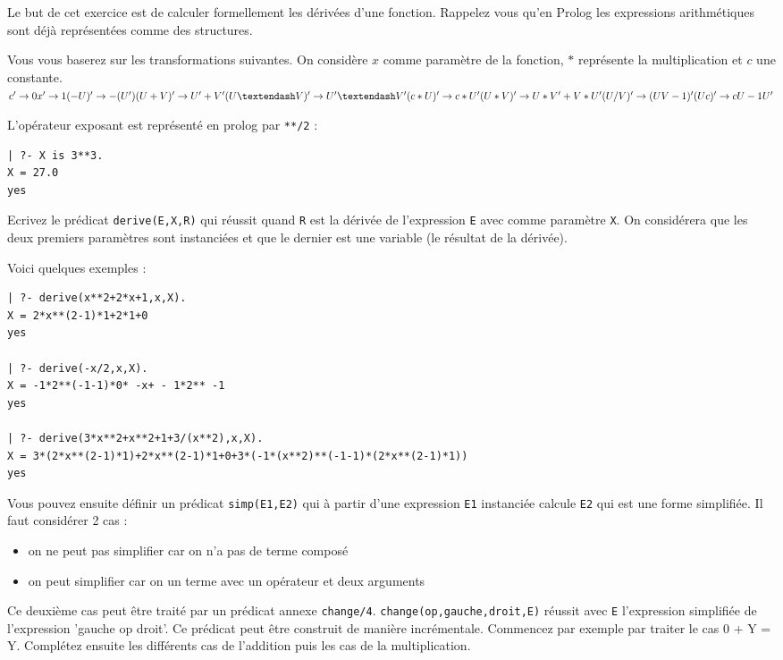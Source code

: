 \documentclass[a4paper]{article}
\begin{document}
\begin{Exercise}[title={les dérivées}]
Le but de cet exercice est de calculer formellement les dérivées d'une 
fonction. Rappelez vous qu'en Prolog les expressions arithmétiques sont
déjà représentées comme des structures.

Vous vous baserez sur les transformations suivantes. On considère $x$ comme
paramètre de la fonction, $*$ représente la multiplication et $c$ une
constante.\\
\begin{math}
c' \rightarrow 0\\
x' \rightarrow 1\\
(-U)' \rightarrow -(U')\\
(U + V)' \rightarrow U' + V'\\
(U – V)' \rightarrow U' – V'\\
(c * U)' \rightarrow c * U'\\
(U * V)' \rightarrow U * V' + V * U'\\
(U /  V)' \rightarrow (UV-1)'\\
(Uc)' \rightarrow c U-1 U'
\end{math}

L'opérateur exposant est représenté en prolog par \verb#**/2# :
\begin{verbatim}
| ?- X is 3**3.                 
X = 27.0 
yes 
\end{verbatim}

Ecrivez le prédicat \verb#derive(E,X,R)# qui réussit quand \verb#R# est la
dérivée de l'expression \verb#E# avec comme paramètre \verb#X#. On considérera
que les deux premiers paramètres sont instanciées et que le dernier est une
variable (le résultat de la dérivée).
 
Voici quelques exemples :
\begin{verbatim}
| ?- derive(x**2+2*x+1,x,X).    
X = 2*x**(2-1)*1+2*1+0 
yes 

| ?- derive(-x/2,x,X). 
X = -1*2**(-1-1)*0* -x+ - 1*2** -1 
yes 

| ?- derive(3*x**2+x**2+1+3/(x**2),x,X).    
X = 3*(2*x**(2-1)*1)+2*x**(2-1)*1+0+3*(-1*(x**2)**(-1-1)*(2*x**(2-1)*1)) 
yes 
\end{verbatim}
Vous pouvez ensuite définir un prédicat \verb#simp(E1,E2)# qui à partir d'une
expression \verb#E1# instanciée calcule \verb#E2# qui est une forme simplifiée.
Il faut considérer 2 cas :
\begin{itemize}
 \item on ne peut pas simplifier car on n'a pas de terme composé
 \item on peut simplifier car on un terme avec un opérateur et deux arguments
\end{itemize}
Ce deuxième cas peut être traité par un prédicat annexe \verb#change/4#.
\verb#change(op,gauche,droit,E)# réussit avec \verb#E# l'expression simplifiée
de l'expression 'gauche op droit'. Ce prédicat peut être construit de manière
incrémentale. Commencez par exemple par traiter le cas 0 + Y = Y. Complétez
ensuite les différents cas de l'addition puis les cas de la multiplication.
\end{Exercise}
\end{document}
